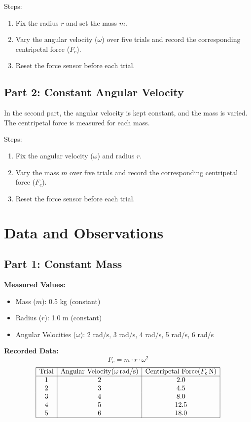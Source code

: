 \documentclass{report}
\begin{document}
Steps:
\begin{enumerate}
    \item Fix the radius \( r \) and set the mass \( m \).
    \item Vary the angular velocity (\( \omega \)) over five trials and record the corresponding centripetal force (\( F_c \)).
    \item Reset the force sensor before each trial.
\end{enumerate}

\subsection{Part 2: Constant Angular Velocity}
In the second part, the angular velocity is kept constant, and the mass is varied. The centripetal force is measured for each mass.

Steps:
\begin{enumerate}
    \item Fix the angular velocity (\( \omega \)) and radius \( r \).
    \item Vary the mass \( m \) over five trials and record the corresponding centripetal force (\( F_c \)).
    \item Reset the force sensor before each trial.
\end{enumerate}

\section{Data and Observations}
\subsection{Part 1: Constant Mass}
\textbf{Measured Values:}
\begin{itemize}
    \item Mass (\( m \)): 0.5 kg (constant)
    \item Radius (\( r \)): 1.0 m (constant)
    \item Angular Velocities (\( \omega \)): 2 rad/s, 3 rad/s, 4 rad/s, 5 rad/s, 6 rad/s
\end{itemize}

\textbf{Recorded Data:}
\[
F_c = m \cdot r \cdot \omega^2
\]
\[
\begin{array}{|c|c|c|}
\hline
\text{Trial} & \text{Angular Velocity} (\omega \, \text{rad/s}) & \text{Centripetal Force} (F_c \, \text{N}) \\
\hline
1 & 2 & 2.0 \\
2 & 3 & 4.5 \\
3 & 4 & 8.0 \\
4 & 5 & 12.5 \\
5 & 6 & 18.0 \\
\hline
\end{array}
\]
\end{document}
